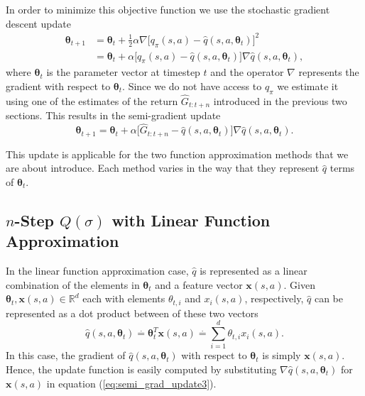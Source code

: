 In order to minimize this objective function we use the stochastic gradient descent update
%
\begin{align}
\label{eq:sgd_update3}
\boldsymbol\theta_{t+1} &= \boldsymbol\theta_t + \frac{1}{2}\alpha \nabla \big[ q_\pi(s,a) 
	- \hat{q}(s,a,\boldsymbol\theta_t) \big]^2 \nonumber \\
&= \boldsymbol\theta_t + \alpha \big[ q_\pi(s,a) - \hat{q}(s,a,\boldsymbol\theta_t) \big] 
	\nabla \hat{q}(s,a,\boldsymbol\theta_t),
\end{align}
%
where $\boldsymbol\theta_t$ is the parameter vector at timestep $t$ and the operator $\nabla$ represents the gradient with respect to $\boldsymbol\theta_t$.
Since we do not have access to $q_\pi$ we estimate it using one of the estimates of the return $\hat{G}_{t:t+n}$ introduced in the previous two sections.
This results in the semi-gradient update
%
\begin{equation}
\label{eq:semi_grad_update3}
\boldsymbol\theta_{t+1} = \boldsymbol\theta_t + \alpha \big[ \hat{G}_{t:t+n} 
	- \hat{q}(s,a,\boldsymbol\theta_t) \big] \nabla \hat{q}(s,a,\boldsymbol\theta_t).
\end{equation}

This update is applicable for the two function approximation methods that we are about introduce.
Each method varies in the way that they represent $\hat{q}$ terms of $\boldsymbol\theta_t$. 

\subsection{$n$-Step $Q(\sigma)$ with Linear Function Approximation}

In the linear function approximation case, $\hat{q}$ is represented as a linear combination of the elements in $\boldsymbol\theta_t$ and a feature vector $\textbf{x} (s,a)$.
Given $\boldsymbol\theta_t, \textbf{x} (s,a) \in \mathbb{R}^d$ each with elements $\theta_{t,i}$ and $x_{i} (s,a)$, respectively, $\hat{q}$ can be represented as a dot product between of these two vectors
%
\begin{equation}
\hat{q}(s,a, \boldsymbol\theta_t) \overset{.}{=} \boldsymbol\theta^T_t 	
	\textbf{x}(s,a) \overset{.}{=} \sum^d_{i=1} \theta_{t,i} x_i(s,a).
\end{equation}
%
In this case, the gradient of $\hat{q} (s,a,\boldsymbol\theta_t)$ with respect to $\boldsymbol\theta_t$ is simply $\textbf{x} (s,a)$. 
Hence, the update function is easily computed by substituting $ \nabla \hat{q}(s,a,\boldsymbol\theta_t)$ for $\textbf{x} (s,a)$ in equation (\ref{eq:semi_grad_update3}). 

